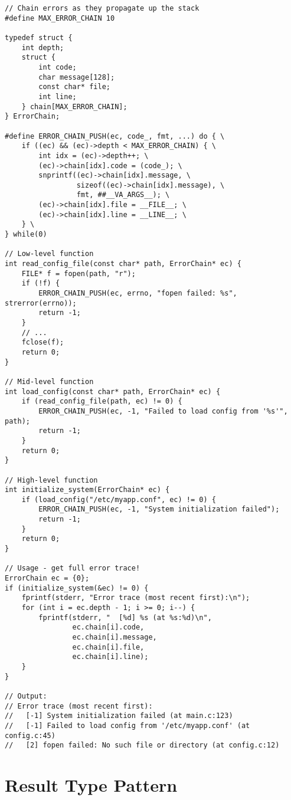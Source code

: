 \begin{lstlisting}
// Chain errors as they propagate up the stack
#define MAX_ERROR_CHAIN 10

typedef struct {
    int depth;
    struct {
        int code;
        char message[128];
        const char* file;
        int line;
    } chain[MAX_ERROR_CHAIN];
} ErrorChain;

#define ERROR_CHAIN_PUSH(ec, code_, fmt, ...) do { \
    if ((ec) && (ec)->depth < MAX_ERROR_CHAIN) { \
        int idx = (ec)->depth++; \
        (ec)->chain[idx].code = (code_); \
        snprintf((ec)->chain[idx].message, \
                 sizeof((ec)->chain[idx].message), \
                 fmt, ##__VA_ARGS__); \
        (ec)->chain[idx].file = __FILE__; \
        (ec)->chain[idx].line = __LINE__; \
    } \
} while(0)

// Low-level function
int read_config_file(const char* path, ErrorChain* ec) {
    FILE* f = fopen(path, "r");
    if (!f) {
        ERROR_CHAIN_PUSH(ec, errno, "fopen failed: %s", strerror(errno));
        return -1;
    }
    // ...
    fclose(f);
    return 0;
}

// Mid-level function
int load_config(const char* path, ErrorChain* ec) {
    if (read_config_file(path, ec) != 0) {
        ERROR_CHAIN_PUSH(ec, -1, "Failed to load config from '%s'", path);
        return -1;
    }
    return 0;
}

// High-level function
int initialize_system(ErrorChain* ec) {
    if (load_config("/etc/myapp.conf", ec) != 0) {
        ERROR_CHAIN_PUSH(ec, -1, "System initialization failed");
        return -1;
    }
    return 0;
}

// Usage - get full error trace!
ErrorChain ec = {0};
if (initialize_system(&ec) != 0) {
    fprintf(stderr, "Error trace (most recent first):\n");
    for (int i = ec.depth - 1; i >= 0; i--) {
        fprintf(stderr, "  [%d] %s (at %s:%d)\n",
                ec.chain[i].code,
                ec.chain[i].message,
                ec.chain[i].file,
                ec.chain[i].line);
    }
}

// Output:
// Error trace (most recent first):
//   [-1] System initialization failed (at main.c:123)
//   [-1] Failed to load config from '/etc/myapp.conf' (at config.c:45)
//   [2] fopen failed: No such file or directory (at config.c:12)
\end{lstlisting}

\section{Result Type Pattern}

